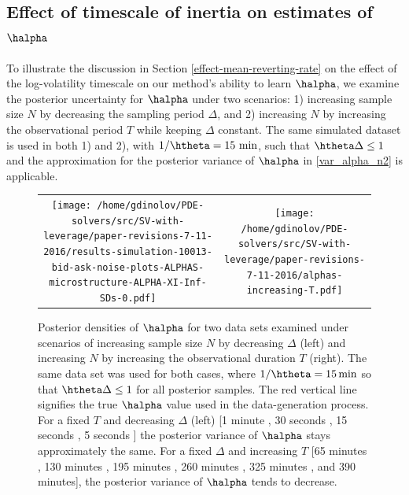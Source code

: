 \subsection{Effect of timescale of inertia on estimates of $\halpha$}\label{se:effect-timescale}

To illustrate the discussion in Section \ref{effect-mean-reverting-rate} on the effect of the log-volatility timescale on our method's ability to learn $\halpha$, we examine the posterior uncertainty for $\halpha$ under two scenarios: 1) increasing sample size $N$ by decreasing the sampling period $\Delta$, and 2) increasing $N$ by increasing the observational period $T$ while keeping $\Delta$ constant. The same simulated dataset is used in both 1) and 2), with $1/\htheta = 15 \mbox{ min}$, such that $\htheta \Delta \leq 1$ and the approximation for the posterior variance of $\halpha$ in \eqref{var_alpha_n2} is applicable.
\begin{figure}[h!]
\centering
\begin{tabular}{cc}
			\begin{minipage}{0.45\textwidth}
				\centering
				\texttt{[image: /home/gdinolov/PDE-solvers/src/SV-with-leverage/paper-revisions-7-11-2016/results-simulation-10013-bid-ask-noise-plots-ALPHAS-microstructure-ALPHA-XI-Inf-SDs-0.pdf]}
			\end{minipage}
			& \begin{minipage}{0.45\textwidth}
				\centering
				\texttt{[image: /home/gdinolov/PDE-solvers/src/SV-with-leverage/paper-revisions-7-11-2016/alphas-increasing-T.pdf]}
				\end{minipage}
\end{tabular}
\caption{Posterior densities of $\halpha$ for two data sets examined under scenarios of increasing sample size $N$ by decreasing $\Delta$ (left) and increasing $N$ by increasing the observational duration $T$ (right). The same data set was used for both cases, where $1/\htheta = 15\, \mbox{min}$ so that $\htheta \Delta \leq 1$ for all posterior samples. The red vertical line signifies the true $\halpha$ value used in the data-generation process. For a fixed $T$ and decreasing $\Delta$ (left) [1 minute \usebox{\legendLineOne}, 30 seconds \usebox{\legendLineTwo}, 15 seconds \usebox{\legendLineThree}, 5 seconds \usebox{\legendLineFour}] the posterior variance of $\halpha$ stays approximately the same. For a fixed $\Delta$ and increasing $T$ [65 minutes \usebox{\legendLineOne}, 130 minutes \usebox{\legendLineTwo}, 195 minutes \usebox{\legendLineThree}, 260 minutes \usebox{\legendLineFour}, 325 minutes \usebox{\legendLineFive}, and 390 \usebox{\legendLineTwo} minutes], the posterior variance of $\halpha$ tends to decrease.}\label{fig:different-phi}
\end{figure}

